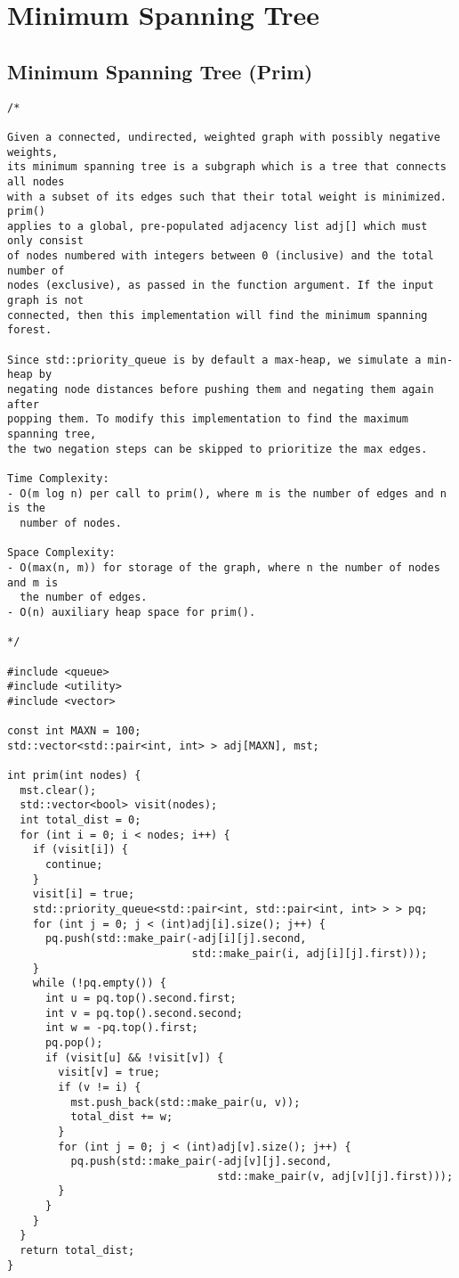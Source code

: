 \section{Minimum Spanning Tree}
\setcounter{section}{4}
\setcounter{subsection}{0}
\subsection{Minimum Spanning Tree (Prim)}
\begin{lstlisting}
/*

Given a connected, undirected, weighted graph with possibly negative weights,
its minimum spanning tree is a subgraph which is a tree that connects all nodes
with a subset of its edges such that their total weight is minimized. prim()
applies to a global, pre-populated adjacency list adj[] which must only consist
of nodes numbered with integers between 0 (inclusive) and the total number of
nodes (exclusive), as passed in the function argument. If the input graph is not
connected, then this implementation will find the minimum spanning forest.

Since std::priority_queue is by default a max-heap, we simulate a min-heap by
negating node distances before pushing them and negating them again after
popping them. To modify this implementation to find the maximum spanning tree,
the two negation steps can be skipped to prioritize the max edges.

Time Complexity:
- O(m log n) per call to prim(), where m is the number of edges and n is the
  number of nodes.

Space Complexity:
- O(max(n, m)) for storage of the graph, where n the number of nodes and m is
  the number of edges.
- O(n) auxiliary heap space for prim().

*/

#include <queue>
#include <utility>
#include <vector>

const int MAXN = 100;
std::vector<std::pair<int, int> > adj[MAXN], mst;

int prim(int nodes) {
  mst.clear();
  std::vector<bool> visit(nodes);
  int total_dist = 0;
  for (int i = 0; i < nodes; i++) {
    if (visit[i]) {
      continue;
    }
    visit[i] = true;
    std::priority_queue<std::pair<int, std::pair<int, int> > > pq;
    for (int j = 0; j < (int)adj[i].size(); j++) {
      pq.push(std::make_pair(-adj[i][j].second,
                             std::make_pair(i, adj[i][j].first)));
    }
    while (!pq.empty()) {
      int u = pq.top().second.first;
      int v = pq.top().second.second;
      int w = -pq.top().first;
      pq.pop();
      if (visit[u] && !visit[v]) {
        visit[v] = true;
        if (v != i) {
          mst.push_back(std::make_pair(u, v));
          total_dist += w;
        }
        for (int j = 0; j < (int)adj[v].size(); j++) {
          pq.push(std::make_pair(-adj[v][j].second,
                                 std::make_pair(v, adj[v][j].first)));
        }
      }
    }
  }
  return total_dist;
}


\end{lstlisting}
